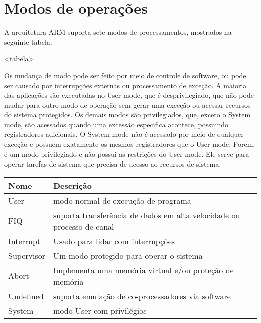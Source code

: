\section{Modos de operações}

A arquitetura ARM suporta sete modos de processamentos, mostrados na seguinte tabela:

<tabela>

Os mudança de modo pode ser feito por meio de controle de software, ou pode ser causado por interrupções externas ou processamento de exceção. A maioria das aplicações são executadas no User mode, que é desprivilegiado, que não pode mudar para outro modo de operação sem gerar uma exceção ou acessar recursos do sistema protegidos. Os demais modos são privilegiados, que, exceto o System mode, são acessados quando uma excessão especifica acontece, possuindo registradores adicionais. O System mode não é acessado por meio de qualquer exceção e possuem exatamente os mesmos registradores que o User mode. Porem, é um modo privilegiado e não possui as restrições do User mode. Ele serve para operar tarefas de sistema que precisa de acesso ao recursos de sistema.

\begin{table}[h]
	\centering
	\begin{tabular}{l|l}
		Nome  & Descrição \\ \hline
		User  & modo normal de execução de programa \\
		FIQ   & suporta transferência de dados em alta velocidade ou processo de canal \\
		Interrupt & Usado para lidar com interrupções \\
		Supervisor & Um modo protegido para operar o sistema \\
		Abort & Implementa uma memória virtual e/ou proteção de memória \\
		Undefined & suporta emulação de co-processadores via software \\
		System & modo User com privilégios \\
	\end{tabular}%
	\label{tab:addlabel}%
\end{table}%
